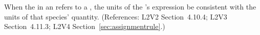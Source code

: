 When the  in an \InitialAssignment refers to a \Species,
the units of the \InitialAssignment's  expression  be
consistent with the units of that species' quantity.  (References:
L2V2 Section~4.10.4; L2V3 Section~4.11.3; L2V4 Section~\ref{sec:assignmentrule}.)
